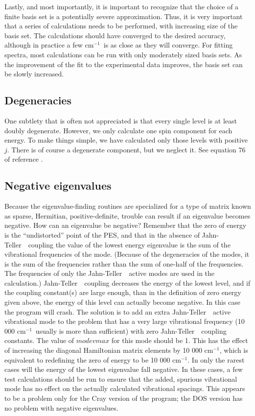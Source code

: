 \documentclass{article}
\newcommand{\wn}{cm$^{-1}$}
\newcommand{\JT}{Jahn-Teller\ }
\begin{document}
Lastly, and most importantly, it is important to recognize that the
choice of a finite basis set is a potentially severe
approximation. Thus, it is very important that a series of
calculations needs to be performed, with increasing size of the basis
set. The calculations should have converged to the desired accuracy,
although in practice a few \wn \ is as close as they will
converge. For fitting spectra, most calculations can be run with only
moderately sized basis sets. As the improvement of the fit to the
experimental data improves, the basis set can be slowly increased.

\subsection{Degeneracies}
One subtlety that is often not appreciated is that every single level
is at least doubly degenerate. However, we only calculate one spin
component for each energy. To make things simple, we have calculated
only those levels with positive $j$. There is of course a degenerate
component, but we neglect it. See equation 76 of reference .

\subsection{Negative eigenvalues} \label{section:negeigs}
Because the eigenvalue-finding routines are specialized for a
type of matrix known as sparse, Hermitian, positive-definite,
trouble can result if an eigenvalue becomes negative. How can an
eigenvalue be negative? Remember that the zero of energy is the
``undistorted'' point of the PES, and that in the absence of \JT\
coupling the value of the lowest energy eigenvalue is the sum of the
vibrational frequencies of the mode. (Because of the degeneracies of
the modes, it is the sum of the frequencies rather than the sum of
one-half of the frequencies. The frequencies of only the \JT\ active
modes are used in the calculation.) \JT\ coupling decreases the
energy of the lowest level, and if the coupling constant(s) are
large enough, than in the definition of zero energy given above, the
energy of this level can actually become negative. In this case the
program will crash. The solution is to add an extra \JT\ active
vibrational mode to the problem that has a very large vibrational
frequency (10 000 \wn\ usually is more than sufficient) with zero
\JT\ coupling constants. The value of $modevmax$ for this mode
should be 1. This has the effect of increasing the diagonal
Hamiltonian matrix elements by 10 000 \wn , which is equivalent to
redefining the zero of energy to be 10 000 \wn . In only the rarest
cases will the energy of the lowest eigenvalue fall negative. In
these cases, a few test calculations should be run to ensure that
the added, spurious vibrational mode has no effect on the actually
calculated vibrational spacings. This appears to be a problem only for
the Cray version of the program; the DOS version has no problem with
negative eigenvalues.
\end{document}

